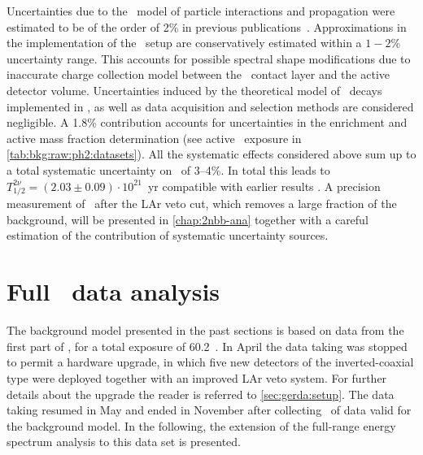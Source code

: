 Uncertainties due to the \geant\ model of particle interactions and propagation were
estimated to be of the order of 2\% in previous publications~\cite{Agostini2013a,
Agostini2015a}. Approximations in the implementation of the \gerda\ setup are
conservatively estimated within a $1-2$\% uncertainty range. This accounts for possible
spectral shape modifications due to inaccurate charge collection model between the \nplus\
contact layer and the active detector volume. Uncertainties induced by the theoretical
model of \nnbb\ decays implemented in \decayzero, as well as data acquisition and
selection methods are considered negligible. A 1.8\% contribution accounts for
uncertainties in the enrichment and active mass fraction determination (see active \gesix\
exposure in \cref{tab:bkg:raw:ph2:datasets}). All the systematic effects considered above
sum up to a total systematic uncertainty on \thalftwo\ of 3--4\%. In total this leads to
$T^{2\nu}_{1/2} = (2.03 \pm 0.09) \cdot 10^{21}$~yr compatible with earlier results
\cite{Agostini2013a, Agostini2015a}. A precision measurement of \thalftwo\ after the LAr
veto cut, which removes a large fraction of the background, will be presented in
\cref{chap:2nbb-ana} together with a careful estimation of the contribution of systematic
uncertainty sources.

\section{Full \phasetwo\ data analysis}%
\label{sec:bkg:raw:ph2p}

The background model presented in the past sections is based on data from the first part
of \phasetwo, for a total exposure of 60.2~\kgyr. In April  the data taking was
stopped to permit a hardware upgrade, in which five new detectors of the inverted-coaxial
type were deployed together with an improved LAr veto system. For further details about
the upgrade the reader is referred to \cref{sec:gerda:setup}. The data taking resumed in
May \yr{2018} and ended in November \yr{2019} after collecting \gexpophasetwopbkg\ of data valid for
the background model. In the following, the extension of the full-range energy spectrum
analysis to this data set is presented.

